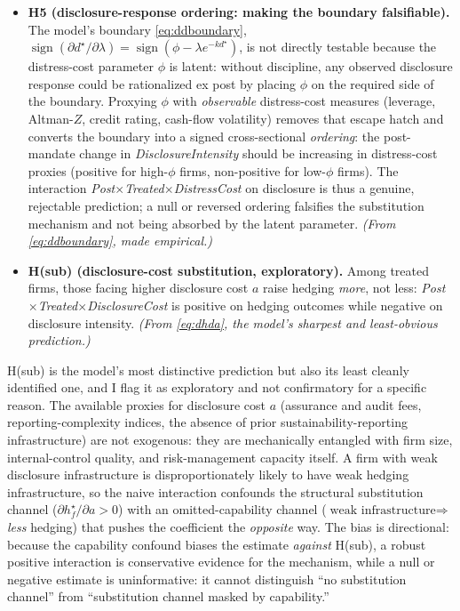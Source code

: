 \documentclass[11pt,a4paper]{article}
\begin{document}
\begin{itemize}
\item \textbf{H5 (disclosure-response ordering: making the boundary falsifiable).} The model's boundary \eqref{eq:ddboundary}, $\operatorname{sign}(\partial d^\star/\partial\lambda)=\operatorname{sign}(\phi-\lambda e^{-kd^\star})$, is not directly testable because the distress-cost parameter $\phi$ is latent: without discipline, any observed disclosure response could be rationalized ex post by placing $\phi$ on the required side of the boundary. Proxying $\phi$ with \emph{observable} distress-cost measures (leverage, Altman-$Z$, credit rating, cash-flow volatility) removes that escape hatch and converts the boundary into a signed cross-sectional \emph{ordering}: the post-mandate change in \emph{DisclosureIntensity} should be increasing in distress-cost proxies (positive for high-$\phi$ firms, non-positive for low-$\phi$ firms). The interaction \emph{Post$\times$Treated$\times$DistressCost} on disclosure is thus a genuine, rejectable prediction; a null or reversed ordering falsifies the substitution mechanism and not being absorbed by the latent parameter. \emph{(From \eqref{eq:ddboundary}, made empirical.)}
\item \textbf{H(sub) (disclosure-cost substitution, exploratory).} Among treated firms, those facing higher disclosure cost $a$ raise hedging \emph{more}, not less: \emph{Post$\times$Treated$\times$DisclosureCost} is positive on hedging outcomes while negative on disclosure intensity. \emph{(From \eqref{eq:dhda}, the model's sharpest and least-obvious prediction.)}
\end{itemize}

H(sub) is the model's most distinctive prediction but also its least cleanly identified one, and I flag it as exploratory and not confirmatory for a specific reason. The available proxies for disclosure cost $a$ (assurance and audit fees, reporting-complexity indices, the absence of prior sustainability-reporting infrastructure) are not exogenous: they are mechanically entangled with firm size, internal-control quality, and risk-management capacity itself. A firm with weak disclosure infrastructure is disproportionately likely to have weak hedging infrastructure, so the naive interaction confounds the structural substitution channel ($\partial h_f^\star/\partial a>0$) with an omitted-capability channel ($\text{weak infrastructure}\Rightarrow$ \emph{less} hedging) that pushes the coefficient the \emph{opposite} way. The bias is directional: because the capability confound biases the estimate \emph{against} H(sub), a robust positive interaction is conservative evidence for the mechanism, while a null or negative estimate is uninformative: it cannot distinguish ``no substitution channel'' from ``substitution channel masked by capability.''
\end{document}
